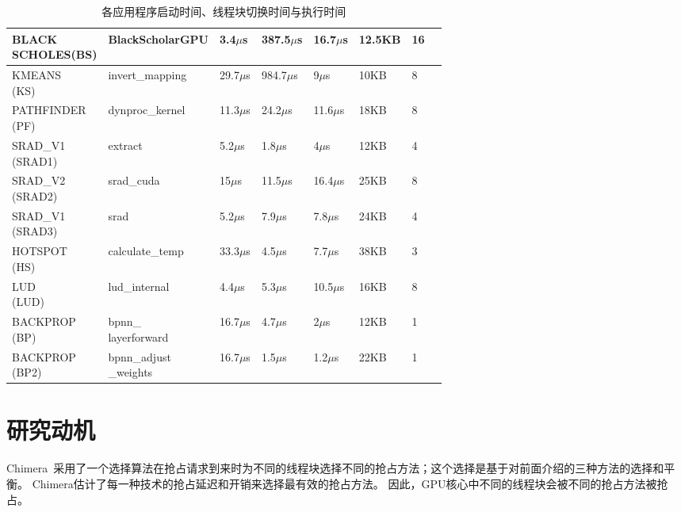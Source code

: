 \begin{scriptsize}
\begin{table}[t]
\begin{tabular}{|l|l|l|l|l|l|l|l|}
    \tabincell{c}{BLACK\\SCHOLES(BS)} & BlackScholarGPU &3.4$\mu$s & 387.5$\mu$s & 16.7$\mu$s&12.5KB&16 \\
    \hline
    \tabincell{c}{KMEANS\\(KS)} & invert\_mapping & 29.7$\mu$s & 984.7$\mu$s & 9$\mu$s&10KB&8\\
    \hline
    \tabincell{c}{PATHFINDER\\(PF)}  & dynproc\_kernel&11.3$\mu$s &24.2$\mu$s&11.6$\mu$s&18KB&8\\
    \hline
    \tabincell{c}{SRAD\_V1\\(SRAD1)} & extract&5.2$\mu$s &1.8$\mu$s&4$\mu$s&12KB&4\\
   	\hline
    \tabincell{c}{SRAD\_V2\\(SRAD2)}  & srad\_cuda& 15$\mu$s & 11.5$\mu$s&16.4$\mu$s&25KB&8\\
    \hline
    \tabincell{c}{SRAD\_V1\\(SRAD3)} & srad & 5.2$\mu$s &7.9$\mu$s &7.8$\mu$s&24KB&4\\
    \hline
    \tabincell{c}{HOTSPOT\\(HS)} & calculate\_temp &33.3$\mu$s&4.5$\mu$s&7.7$\mu$s&38KB&3\\
    \hline
    \tabincell{c}{LUD\\(LUD)} & lud\_internal & 4.4$\mu$s &5.3$\mu$s&10.5$\mu$s&16KB&8\\
    \hline
    \tabincell{c}{BACKPROP\\(BP)} & \tabincell{c}{bpnn\_ \\ layerforward} & 16.7$\mu$s &4.7$\mu$s &2$\mu$s&12KB&1\\
    \hline
    \tabincell{c}{BACKPROP\\(BP2)} & \tabincell{c}{bpnn\_adjust \\ \_weights} & 16.7$\mu$s & 1.5$\mu$s &1.2$\mu$s&22KB&1\\
    \hline
    
  \end{tabular}
  \caption{各应用程序启动时间、线程块切换时间与执行时间}
  \label{table:time}
\end{table}
\end{scriptsize}

\section{研究动机}
\label{sec:pepmotivation}

Chimera~采用了一个选择算法在抢占请求到来时为不同的线程块选择不同的抢占方法；这个选择是基于对前面介绍的三种方法的选择和平衡。
Chimera估计了每一种技术的抢占延迟和开销来选择最有效的抢占方法。
因此，GPU核心中不同的线程块会被不同的抢占方法被抢占。

